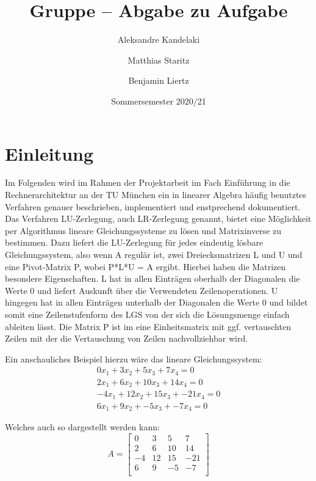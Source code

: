 \documentclass[course=erap]{aspdoc}
\author{⁨Aleksandre Kandelaki \and Matthias Staritz \and Benjamin Liertz}
\date{Sommersemester 2020/21} %
\title{Gruppe \theGroup{} -- Abgabe zu Aufgabe \theNumber}
\begin{document}
\maketitle

\section{Einleitung}


Im Folgenden wird im Rahmen der Projektarbeit im Fach Einführung
in die Rechnerarchitektur an der TU München ein in linearer Algebra häufig 
benutztes Verfahren genauer beschrieben, implementiert und enstprechend dokumentiert.\\

\noindent\hspace*{15mm}%
Das Verfahren LU-Zerlegung, auch LR-Zerlegung genannt,
 bietet eine Möglichkeit per Algorithmus lineare Gleichungssysteme zu lösen und Matrixinverse zu bestimmen.
Dazu liefert die LU-Zerlegung für jedes eindeutig
 lösbare Gleichungssystem, also wenn A regulär ist,
  zwei Dreiecksmatrizen L und U und eine Pivot-Matrix P,
   wobei P*L*U = A ergibt. Hierbei haben die Matrizen besondere 
   Eigenschaften. L hat in allen Einträgen oberhalb der Diagonalen die Werte 0 und liefert 
   Auskunft über die Verwendeten Zeilenoperationen. U hingegen hat in allen Einträgen unterhalb
    der Diagonalen die Werte 0 und bildet somit eine Zeilenstufenform des LGS von der sich die 
    Lösungsmenge einfach ableiten lässt. Die Matrix P ist im eine Einheitsmatrix mit ggf. 
    vertauschten Zeilen mit der die Vertauschung von Zeilen nachvollziehbar wird.
    

\noindent\hspace*{15mm}%
Ein anschauliches Beispiel hierzu wäre das lineare Gleichungssystem:
\begin{eqnarray}
0x_1 + 3x_2 + 5x_3 + 7x_4 = 0 \\
2x_1 + 6x_2 + 10x_3 + 14x_4 = 0\\
-4x_1 + 12x_2 + 15x_3 + -21x_4 = 0\\
6x_1 + 9x_2 + -5x_3 + -7x_4 = 0
\end{eqnarray}



\noindent\hspace*{15mm}%
Welches auch so dargestellt werden kann:
\begin{equation}
A = \begin{bmatrix}
 0	& 3	 & 5  & 7 \\
 2	& 6	 & 10 & 14 \\
-4	& 12 & 15 & -21\\
 6	& 9  & -5 & -7\\
 \end{bmatrix}
\end{equation}
\end{document}

